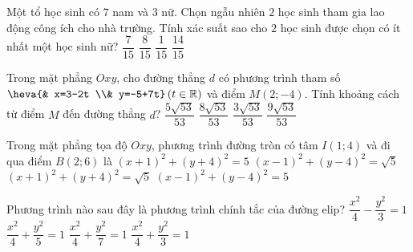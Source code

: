 \begin{ex}
 Một tổ học sinh có $7$ nam và $3$ nữ. Chọn ngẫu nhiên $2$ học sinh tham gia lao động công ích cho nhà trường. Tính xác suất sao cho $2$ học sinh được chọn có ít nhất một học sinh nữ?
\choice
{$\dfrac{7}{15}$}
{\True $\dfrac{8}{15}$}
{$\dfrac{1}{15}$}
{$\dfrac{14}{15}$}
\end{ex}
\begin{ex}
 Trong mặt phẳng $Oxy$, cho đường thẳng $d$ có phương trình tham số$\heva{& x=3-2t \\& y=-5+7t}\left(t\in \mathbb{R}\right)$ và điểm $M(2;-4)$. Tính khoảng cách từ điểm $M$ đến đường thẳng $d$?
\choice
{\True $\dfrac{5\sqrt{53}}{53}$}
{$\dfrac{8\sqrt{53}}{53}$}
{$\dfrac{3\sqrt{53}}{53}$}
{$\dfrac{9\sqrt{53}}{53}$}
\end{ex}
\begin{ex}
Trong mặt phẳng tọa độ $Oxy$, phương trình đường tròn có tâm $I(1;4)$ và đi qua điểm $B(2;6)$ là
\choice
{$(x+1)^2+{{(y+4)}^2}=5$}
{${{(x-1)}^2}+{{(y-4)}^2}=\sqrt{5}$}
{${{(x+1)}^2}+{{(y+4)}^2}=\sqrt{5}$}
{\True ${{(x-1)}^2}+{{(y-4)}^2}=5$}
\end{ex}
\begin{ex}
 Phương trình nào sau đây là phương trình chính tắc của đường elip?
\choice
{$\dfrac{x^2}{4}-\dfrac{y^2}{3}=1$}
{$\dfrac{x^2}{4}+\dfrac{y^2}{5}=1$}
{$\dfrac{x^2}{4}+\dfrac{y^2}{7}=1$}
{\True $\dfrac{x^2}{4}+\dfrac{y^2}{3}=1$}
\end{ex}
